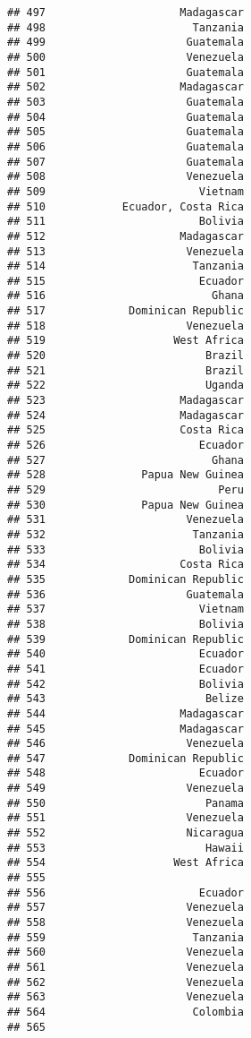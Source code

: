 \documentclass[
]{article}
\begin{document}
\begin{verbatim}
## 497                     Madagascar
## 498                       Tanzania
## 499                      Guatemala
## 500                      Venezuela
## 501                      Guatemala
## 502                     Madagascar
## 503                      Guatemala
## 504                      Guatemala
## 505                      Guatemala
## 506                      Guatemala
## 507                      Guatemala
## 508                      Venezuela
## 509                        Vietnam
## 510            Ecuador, Costa Rica
## 511                        Bolivia
## 512                     Madagascar
## 513                      Venezuela
## 514                       Tanzania
## 515                        Ecuador
## 516                          Ghana
## 517             Dominican Republic
## 518                      Venezuela
## 519                    West Africa
## 520                         Brazil
## 521                         Brazil
## 522                         Uganda
## 523                     Madagascar
## 524                     Madagascar
## 525                     Costa Rica
## 526                        Ecuador
## 527                          Ghana
## 528               Papua New Guinea
## 529                           Peru
## 530               Papua New Guinea
## 531                      Venezuela
## 532                       Tanzania
## 533                        Bolivia
## 534                     Costa Rica
## 535             Dominican Republic
## 536                      Guatemala
## 537                        Vietnam
## 538                        Bolivia
## 539             Dominican Republic
## 540                        Ecuador
## 541                        Ecuador
## 542                        Bolivia
## 543                         Belize
## 544                     Madagascar
## 545                     Madagascar
## 546                      Venezuela
## 547             Dominican Republic
## 548                        Ecuador
## 549                      Venezuela
## 550                         Panama
## 551                      Venezuela
## 552                      Nicaragua
## 553                         Hawaii
## 554                    West Africa
## 555                               
## 556                        Ecuador
## 557                      Venezuela
## 558                      Venezuela
## 559                       Tanzania
## 560                      Venezuela
## 561                      Venezuela
## 562                      Venezuela
## 563                      Venezuela
## 564                       Colombia
## 565                               

\end{verbatim}
\end{document}
